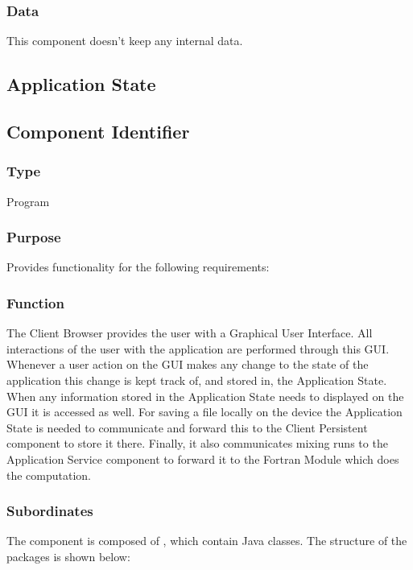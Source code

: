 \subsubsection*{Data}
This component doesn't keep any internal data.

\subsection{Application State}
\label{subsec:appstate}

\subsection*{Component Identifier}
\RTMCAS{}

\subsubsection*{Type}
Program

\subsubsection*{Purpose}
Provides functionality for the following requirements:

\noindent {}

\subsubsection*{Function}
The Client Browser provides the user with a Graphical User Interface. All interactions of the user with the application are performed through this GUI. Whenever a user action on the GUI makes any change to the state of the application this change is kept track of, and stored in, the Application State. When any information stored in the Application State needs to displayed on the GUI it is accessed as well. For saving a file locally on the device the Application State is needed to communicate and forward this to the Client Persistent component to store it there. Finally, it also communicates mixing runs to the Application Service component to forward it to the Fortran Module which does the computation.

\subsubsection*{Subordinates}
The component is composed of , which contain Java classes. The structure of the packages is shown below:

